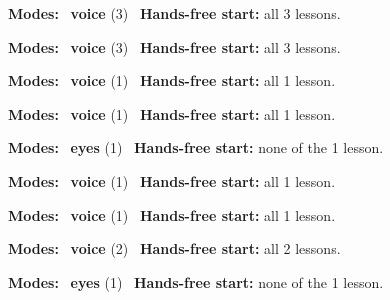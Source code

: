 \expandafter\def\csname hlchaptermodality15\endcsname{%
  {\small\noindent
    \textbf{Modes:} \hlvoicesign{}~\textbf{voice} (3)\quad
    \hlvoicesign{}~\textbf{Hands-free start:} all 3 lessons.%
    \par}\medskip
}

\expandafter\def\csname hlchaptermodality16\endcsname{%
  {\small\noindent
    \textbf{Modes:} \hlvoicesign{}~\textbf{voice} (3)\quad
    \hlvoicesign{}~\textbf{Hands-free start:} all 3 lessons.%
    \par}\medskip
}

\expandafter\def\csname hlchaptermodality17\endcsname{%
  {\small\noindent
    \textbf{Modes:} \hlvoicesign{}~\textbf{voice} (1)\quad
    \hlvoicesign{}~\textbf{Hands-free start:} all 1 lesson.%
    \par}\medskip
}

\expandafter\def\csname hlchaptermodality18\endcsname{%
  {\small\noindent
    \textbf{Modes:} \hlvoicesign{}~\textbf{voice} (1)\quad
    \hlvoicesign{}~\textbf{Hands-free start:} all 1 lesson.%
    \par}\medskip
}

\expandafter\def\csname hlchaptermodality19\endcsname{%
  {\small\noindent
    \textbf{Modes:} \hlsightsign{}~\textbf{eyes} (1)\quad
    \hlvoicesign{}~\textbf{Hands-free start:} none of the 1 lesson.%
    \par}\medskip
}

\expandafter\def\csname hlchaptermodality20\endcsname{%
  {\small\noindent
    \textbf{Modes:} \hlvoicesign{}~\textbf{voice} (1)\quad
    \hlvoicesign{}~\textbf{Hands-free start:} all 1 lesson.%
    \par}\medskip
}

\expandafter\def\csname hlchaptermodality21\endcsname{%
  {\small\noindent
    \textbf{Modes:} \hlvoicesign{}~\textbf{voice} (1)\quad
    \hlvoicesign{}~\textbf{Hands-free start:} all 1 lesson.%
    \par}\medskip
}

\expandafter\def\csname hlchaptermodality22\endcsname{%
  {\small\noindent
    \textbf{Modes:} \hlvoicesign{}~\textbf{voice} (2)\quad
    \hlvoicesign{}~\textbf{Hands-free start:} all 2 lessons.%
    \par}\medskip
}

\expandafter\def\csname hlchaptermodality23\endcsname{%
  {\small\noindent
    \textbf{Modes:} \hlsightsign{}~\textbf{eyes} (1)\quad
    \hlvoicesign{}~\textbf{Hands-free start:} none of the 1 lesson.%
    \par}\medskip
}

